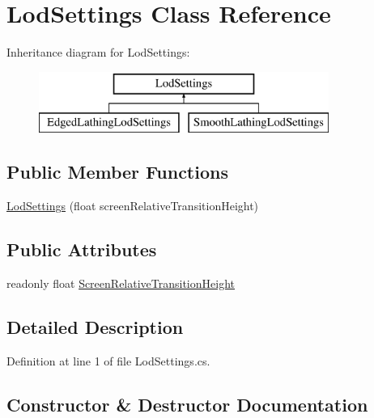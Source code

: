 \hypertarget{class_lod_settings}{}\section{Lod\+Settings Class Reference}
\label{class_lod_settings}
Inheritance diagram for Lod\+Settings\+:\begin{figure}[H]
\begin{center}
\leavevmode
\includegraphics[height=2.000000cm]{class_lod_settings}
\end{center}
\end{figure}
\subsection*{Public Member Functions}
\begin{DoxyCompactItemize}
\item 
\mbox{\hyperlink{class_lod_settings_a604a6a3008c06d9d16b5fb3775e05a12}{Lod\+Settings}} (float screen\+Relative\+Transition\+Height)
\end{DoxyCompactItemize}
\subsection*{Public Attributes}
\begin{DoxyCompactItemize}
\item 
readonly float \mbox{\hyperlink{class_lod_settings_a38ac54ce2be38e74cdc4c66ca8541145}{Screen\+Relative\+Transition\+Height}}
\end{DoxyCompactItemize}


\subsection{Detailed Description}


Definition at line 1 of file Lod\+Settings.\+cs.



\subsection{Constructor \& Destructor Documentation}
\mbox{\label{class_lod_settings_a604a6a3008c06d9d16b5fb3775e05a12}} 
